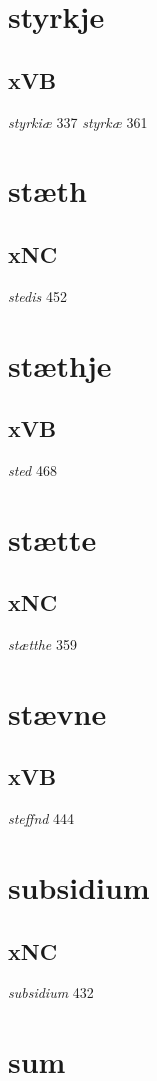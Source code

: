 \documentclass[a4paper,twocolumn]{article}
\begin{document}
\section{styrkje}
\label{sec:org0fc5e03}
\subsection{xVB}
\label{sec:orgd367ad9}
\emph{styrkiæ} 337 \emph{styrkæ} 361 
\section{stæth}
\label{sec:org48b1abb}
\subsection{xNC}
\label{sec:orgce52a76}
\emph{stedis} 452 
\section{stæthje}
\label{sec:org25c017d}
\subsection{xVB}
\label{sec:org974d90d}
\emph{sted} 468 
\section{stætte}
\label{sec:org4231052}
\subsection{xNC}
\label{sec:org6aea4e5}
\emph{stætthe} 359 
\section{stævne}
\label{sec:org6f23c8b}
\subsection{xVB}
\label{sec:org423bab7}
\emph{steffnd} 444 
\section{subsidium}
\label{sec:org11298c3}
\subsection{xNC}
\label{sec:org3e274fb}
\emph{subsidium} 432 
\section{sum}
\label{sec:org3789b15}
\end{document}
